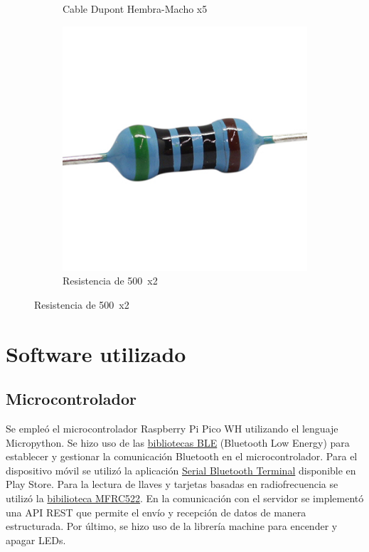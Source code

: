 \documentclass{article}
\begin{document}
\begin{figure}[H]
\begin{subfigure}[b]{0.3\textwidth}
		\caption*{Cable Dupont Hembra-Macho x5}
		\label{fig:cable mh}
	\end{subfigure}
	\hfill
	\begin{subfigure}[b]{0.3\textwidth}
		\includegraphics[width=\textwidth]{../images/resistencia.jpg}
		\caption*{Resistencia de 500\textOmega\ x2}
		\label{fig:resistencia}
	\end{subfigure}
\end{figure}


\section{Software utilizado}
\subsection{Microcontrolador}
Se empleó el microcontrolador Raspberry Pi Pico WH utilizando el lenguaje Micropython. Se hizo uso de las \href{https://github.com/micropython/micropython/tree/master/examples/bluetooth}{bibliotecas BLE} (Bluetooth Low Energy) para establecer y gestionar la comunicación Bluetooth en el microcontrolador. Para el dispositivo móvil se utilizó la aplicación \href{https://play.google.com/store/apps/details?id=de.kai_morich.serial_usb_terminal&pcampaignid=web_share}{Serial Bluetooth Terminal} disponible en Play Store. Para la lectura de llaves y tarjetas basadas en radiofrecuencia se utilizó la \href{https://github.com/danjperron/micropython-mfrc522/blob/master/mfrc522.py}{bibilioteca MFRC522}. En la comunicación con el servidor se implementó una API REST que permite el envío y recepción de datos de manera estructurada. Por último, se hizo uso de la librería machine para encender y apagar LEDs.
\end{document}
